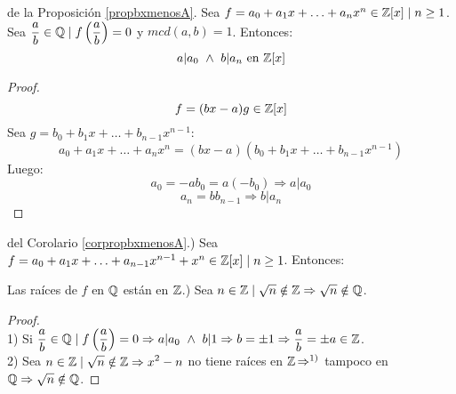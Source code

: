 \begin{coro}
    \label{corpropbxmenosA}
    de la Proposición \ref{propbxmenosA}.\newline
    Sea $f=a_0+a_1x+\ldots+a_nx^n \in \mathbb Z[x] \mid n\geq 1$. \newline Sea $\dfrac{a}{b} \in \mathbb Q \mid f\left(\dfrac{a}{b}\right)=0$
    y $mcd(a,b)=1$. Entonces:
    $$a|a_0 \ \land \  b|a_n \mbox{ en } \mathbb Z[x]$$
\begin{proof}
    $$f=(bx-a)g \in \mathbb Z[x]$$
    Sea $g = b_0+b_1x + \ldots + b_{n-1}x^{n-1}$:
    $$a_0+a_1x+\ldots+a_nx^n = (bx-a)(b_0+b_1x + \ldots + b_{n-1}x^{n-1})$$
    Luego: $$a_0=-ab_0=a(-b_0) \Rightarrow a|a_0$$
    $$a_n=bb_{n-1}\Rightarrow b|a_n$$
\end{proof}
\end{coro}

\begin{coro}
    del Corolario \ref{corpropbxmenosA}.) Sea $f=a_0+a_1x + \ldots +a_{n-1}x^{n-1}+x^n \in \mathbb Z[x] \mid n\geq 1$. Entonces:\par
    Las raíces de $f$ en $\mathbb Q$ están en $\mathbb Z$.) Sea $n \in \mathbb Z \mid \sqrt{n} \notin \mathbb Z \Rightarrow \sqrt{n} \notin \mathbb Q$.
\begin{proof}
    \ \\
    1) Si $\dfrac{a}{b} \in \mathbb Q \mid f\left(\dfrac{a}{b}\right)=0 \Rightarrow a|a_0 \ \land \  b|1 \Rightarrow b=\pm 1
        \Rightarrow \dfrac{a}{b} = \pm a \in \mathbb Z$.\\

    
    2) Sea $\displaystyle n \in \mathbb Z \mid \sqrt{n} \notin \mathbb Z \Rightarrow x^2-n$ no tiene raíces en $\mathbb Z \mathop{\Rightarrow}^{1)} $
    tampoco en $\mathbb Q \Rightarrow \sqrt{n} \notin \mathbb Q$.
\end{proof}
\end{coro}

